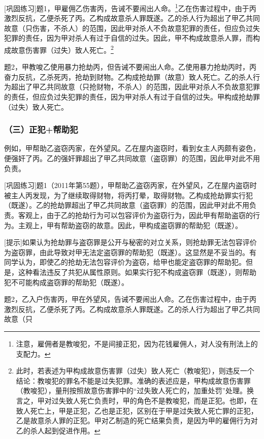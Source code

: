 [巩固练习]题1，甲雇佣乙伤害丙，告诫不要闹出人命。\footnote{注意，雇佣者是教唆犯，不是间接正犯，因为花钱雇佣人，对人没有刑法上的支配力。}乙在伤害过程中，由于丙激烈反抗，乙便杀死了丙。乙构成故意杀人罪既遂。乙的杀人行为超出了甲乙共同故意（只伤害，不杀人）的范围，因此甲对杀人不负故意犯罪的责任，但应负过失犯罪的责任，因为甲对杀人有过于自信的过失。因此，甲不构成故意杀人罪，而构成故意伤害罪（过失）致人死亡。\footnote{此时，若表述为甲构成故意伤害罪（过失）致人死亡（教唆犯），则违反一个结论：教唆犯的罪名不能是过失犯罪。准确的表述应是，甲构成故意伤害罪（教唆犯），量刑按照故意伤害罪中的“过失致人死亡的，加重处罚”处理。换言之，甲对过失致人死亡负责时，甲的角色不是教唆犯，而是正犯。也即，在致人死亡上，甲是正犯，乙也是正犯，区别在于甲是过失致人死亡罪的正犯，乙是故意杀人罪的正犯。甲对乙制造的死亡结果负责，是因为甲的雇佣行为对乙的杀人起到促进作用。}

题2，甲教唆乙使用暴力抢劫丙，但告诫不要闹出人命。乙使用暴力抢劫丙时，丙奋力反抗，乙杀死丙，抢劫到财物。乙构成抢劫罪（故意）致人死亡。乙的杀人行为超出了甲乙共同故意（只抢财物，不杀人）的范围，因此甲对杀人不负故意犯罪的责任，但应负过失犯罪的责任，因为甲对杀人有过于自信的过失。甲构成抢劫罪（过失）致人死亡。

\subsubsection*{（三）正犯+帮助犯}

例如，甲帮助乙盗窃丙家，在外望风。乙在屋内盗窃时，看到女主人丙颇有姿色，便强奸了丙。乙的强奸罪超出了甲乙共同故意（盗窃罪）的范围，因此甲对此不用负责。

[巩固练习]题1（2011年第55题），甲帮助乙盗窃丙家，在外望风，乙在屋内盗窃时被主人丙发现，为了继续取得财物，将丙打晕，取得财物。乙构成抢劫罪实行犯（既遂）。乙的抢劫罪超出了甲乙共同故意（盗窃罪）的范围，因此甲对此不用负责。客观上，由于乙的抢劫行为可以包容评价为盗窃行为，因此甲有帮助盗窃的行为。主观上，甲有帮助盗窃的故意。因此，甲构成盗窃罪的帮助犯（既遂）。

[提示]如果认为抢劫罪与盗窃罪是公开与秘密的对立关系，则抢劫罪无法包容评价为盗窃罪，由此导致对甲无法定盗窃罪的帮助犯（既遂）。这显然是不妥当的。有同学认为，即使乙的抢劫无法包容评价为盗窃，给甲也能定盗窃罪的帮助犯。但是，这种看法违反了共犯从属性原则。如果实行犯不构成盗窃罪（既遂），则帮助犯不可能构成盗窃罪的帮助犯（既遂）。

题2，乙入户伤害丙，甲在外望风，告诫不要闹出人命。乙在伤害过程中，由于丙激烈反抗，乙便杀死了丙。乙构成故意杀人罪既遂。乙的杀人行为超出了甲乙共同故意（只

